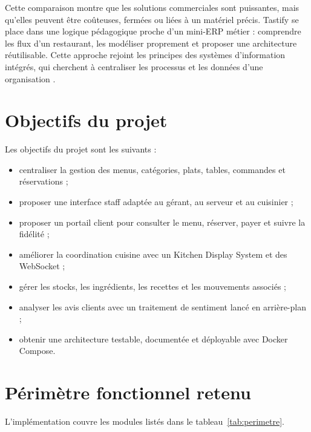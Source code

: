 Cette comparaison montre que les solutions commerciales sont puissantes, mais qu'elles peuvent être coûteuses, fermées ou liées à un matériel précis. Tastify se place dans une logique pédagogique proche d'un mini-ERP métier : comprendre les flux d'un restaurant, les modéliser proprement et proposer une architecture réutilisable. Cette approche rejoint les principes des systèmes d'information intégrés, qui cherchent à centraliser les processus et les données d'une organisation \cite{davenport1998enterprise,monk2013erp}.

\section{Objectifs du projet}
Les objectifs du projet sont les suivants :

\begin{itemize}
  \item centraliser la gestion des menus, catégories, plats, tables, commandes et réservations ;
  \item proposer une interface staff adaptée au gérant, au serveur et au cuisinier ;
  \item proposer un portail client pour consulter le menu, réserver, payer et suivre la fidélité ;
  \item améliorer la coordination cuisine avec un Kitchen Display System et des WebSocket ;
  \item gérer les stocks, les ingrédients, les recettes et les mouvements associés ;
  \item analyser les avis clients avec un traitement de sentiment lancé en arrière-plan ;
  \item obtenir une architecture testable, documentée et déployable avec Docker Compose.
\end{itemize}

\section{Périmètre fonctionnel retenu}
L'implémentation couvre les modules listés dans le tableau~\ref{tab:perimetre}.

